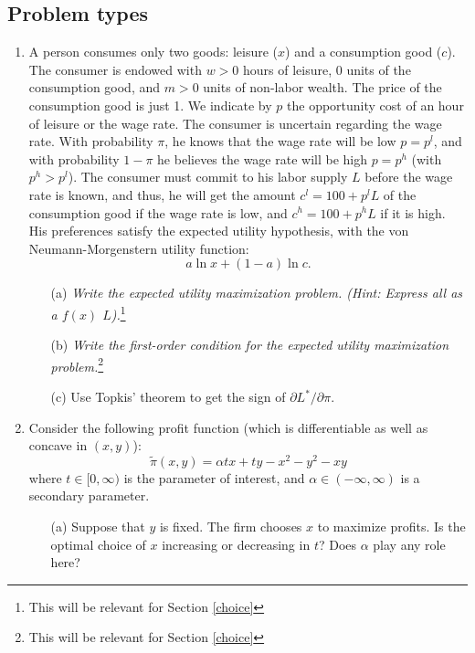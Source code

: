 \documentclass{article}
\begin{document}
\subsection{Problem types}
\begin{enumerate}
    \item A person consumes only two goods: leisure (\(x\)) and a consumption good (\(c\)). The consumer is endowed with \(w > 0\) hours of leisure, 0 units of the consumption good, and \(m > 0\) units of non-labor wealth. The price of the consumption good is just 1. We indicate by \(p\) the opportunity cost of an hour of leisure or the wage rate. The consumer is uncertain regarding the wage rate. With probability \(\pi\), he knows that the wage rate will be low \(p = p^l\), and with probability \(1 - \pi\) he believes the wage rate will be high \(p = p^h\) (with \(p^h > p^l\)). The consumer must commit to his labor supply \(L\) before the wage rate is known, and thus, he will get the amount \(c^l = 100 + p^l L\) of the consumption good if the wage rate is low, and \(c^h = 100 + p^h L\) if it is high.
    \\
    His preferences satisfy the expected utility hypothesis, with the von Neumann-Morgenstern utility function:
    \[
    a \ln x + (1 - a) \ln c.
    \]
    \begin{enumerate}
        \item[(a)] \textit{Write the expected utility maximization problem. (Hint: Express all as a $f(x)$ \(L\)).}\footnote{This will be relevant for Section \ref{choice}}
        \item[(b)] \textit{Write the first-order condition for the expected utility maximization problem.}\footnote{This will be relevant for Section \ref{choice}}
        \item[(c)] Use Topkis' theorem to get the sign of \(\partial L^* / \partial \pi\).
    \end{enumerate}
    \item Consider the following profit function (which is differentiable as well as concave in \((x, y)\)):
    \[
    \tilde{\pi}(x, y) = \alpha tx + ty - x^2 - y^2 - xy
    \]
    where \(t \in [0, \infty)\) is the parameter of interest, and \(\alpha \in (-\infty, \infty)\) is a secondary parameter.
    \begin{enumerate}
        \item[(a)] Suppose that \(y\) is fixed. The firm chooses \(x\) to maximize profits. Is the optimal choice of \(x\) increasing or decreasing in \(t\)? Does \(\alpha\) play any role here?
    

\end{enumerate}
\end{enumerate}
\end{document}
